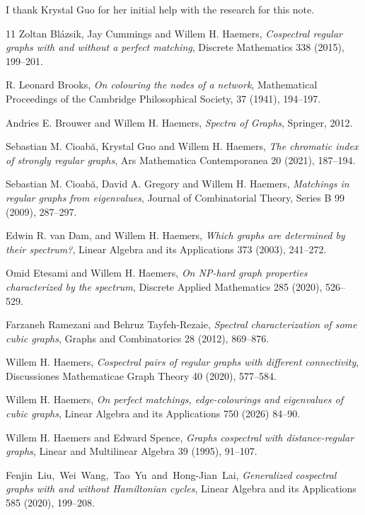 \documentclass{article}
\begin{document}
I thank Krystal Guo for her initial help with the research for this note.
%
\begin{thebibliography}{11}
Zoltan Bl\'azsik, Jay Cummings and Willem H. Haemers,
{\em Cospectral regular graphs with and without a perfect matching},
Discrete Mathematics 338 (2015), 199--201.

R. Leonard Brooks, 
{\em On colouring the nodes of a network}, Mathematical Proceedings of the Cambridge Philosophical Society, 37 (1941), 194--197.

Andries E. Brouwer and Willem H. Haemers, {\em Spectra of Graphs}, Springer, 2012.

Sebastian M. Cioab\u{a}, Krystal Guo and Willem H. Haemers,
{\em The chromatic index of strongly regular graphs}, 
Ars Mathematica Contemporanea 20 (2021), 187--194.

Sebastian M. Cioab\u{a}, David A. Gregory and Willem H. Haemers,
{\em
Matchings in regular graphs from eigenvalues},
Journal of Combinatorial Theory, Series B 99 (2009), 287--297.

 Edwin R. van Dam, and Willem H. Haemers,
{\em Which graphs are determined by their spectrum?},
Linear Algebra and its Applications 373 (2003), 241--272.

Omid Etesami and Willem H. Haemers,
{\em On NP-hard graph properties characterized by the spectrum},
Discrete Applied Mathematics 285 (2020), 526--529.

Farzaneh Ramezani and Behruz Tayfeh-Rezaie,
{\em Spectral characterization of some cubic graphs},
Graphs and Combinatorics 28 (2012), 869--876.

 Willem H. Haemers,
{\em Cospectral pairs of regular graphs with different connectivity},
Discussiones Mathematicae Graph Theory 40 (2020), 577–584.

 Willem H. Haemers,
{\em On perfect matchings, edge-colourings and eigenvalues of cubic graphs}, 
Linear Algebra and its Applications 750 (2026) 84--90.

Willem H. Haemers and Edward Spence,
{\em Graphs cospectral with distance-regular graphs},
Linear and Multilinear Algebra 39 (1995), 91--107.

Fenjin~Liu,~Wei~Wang,~Tao~Yu~and~Hong-Jian~Lai,
{\em Generalized cospectral graphs with and without Hamiltonian cycles},
Linear Algebra and its Applications 585 (2020), 199--208.


\end{thebibliography}
\end{document}
